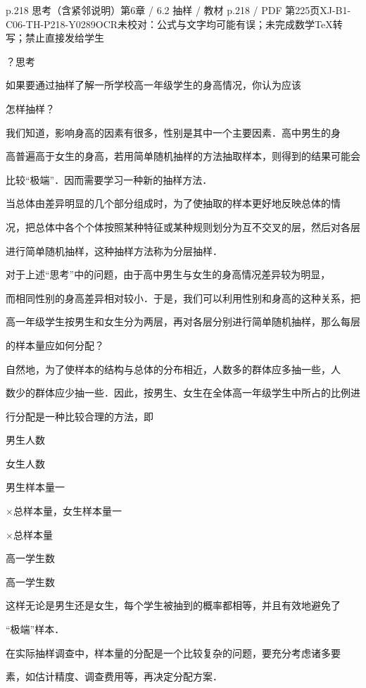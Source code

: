 \begin{bankitem}{p.218 思考（含紧邻说明）}{第6章 / 6.2 抽样 / 教材 p.218 / PDF 第225页}{XJ-B1-C06-TH-P218-Y0289}{OCR未校对：公式与文字均可能有误；未完成数学TeX转写；禁止直接发给学生}
\begin{ocrdraft}
\par
？思考
\par
如果要通过抽样了解一所学校高一年级学生的身高情况，你认为应该
\par
怎样抽样？
\par
我们知道，影响身高的因素有很多，性别是其中一个主要因素．高中男生的身
\par
高普遍高于女生的身高，若用简单随机抽样的方法抽取样本，则得到的结果可能会
\par
比较“极端”．因而需要学习一种新的抽样方法．
\par
当总体由差异明显的几个部分组成时，为了使抽取的样本更好地反映总体的情
\par
况，把总体中各个个体按照某种特征或某种规则划分为互不交叉的层，然后对各层
\par
进行简单随机抽样，这种抽样方法称为分层抽样．
\par
对于上述“思考”中的问题，由于高中男生与女生的身高情况差异较为明显，
\par
而相同性别的身高差异相对较小．于是，我们可以利用性别和身高的这种关系，把
\par
高一年级学生按男生和女生分为两层，再对各层分别进行简单随机抽样，那么每层
\par
的样本量应如何分配？
\par
自然地，为了使样本的结构与总体的分布相近，人数多的群体应多抽一些，人
\par
数少的群体应少抽一些．因此，按男生、女生在全体高一年级学生中所占的比例进
\par
行分配是一种比较合理的方法，即
\par
男生人数
\par
女生人数
\par
男生样本量一
\par
\ensuremath{\times}总样本量，女生样本量一
\par
\ensuremath{\times}总样本量
\par
高一学生数
\par
高一学生数
\par
这样无论是男生还是女生，每个学生被抽到的概率都相等，并且有效地避免了
\par
“极端”样本．
\par
在实际抽样调查中，样本量的分配是一个比较复杂的问题，要充分考虑诸多要
\par
素，如估计精度、调查费用等，再决定分配方案．
\end{ocrdraft}
\end{bankitem}
